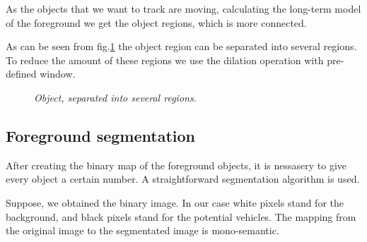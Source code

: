\documentclass[12pt,a4paper,oneside,titlepage]{article}
\begin{document}
As the objects that we want to track are moving, calculating the long-term model of  the foreground we get the object regions, which is more connected.

As can be seen from fig.\ref{fig:fig3} the object region can be separated into several regions.
To reduce the amount of these regions we use the dilation operation with pre-defined window.




\begin{figure}[h]
  \caption{\textit{Object, separated into several regions.}}
  \label{fig:fig3}
\end{figure}

































\subsection{Foreground segmentation}


After creating the binary map of the foreground objects, it is nessasery to give every object a certain number.
A straightforward segmentation algorithm is used.


Suppose, we obtained the binary image.
In our case white pixels stand for the background, and black pixels stand for the potential vehicles.
The mapping from the original image to the segmentated image is mono-semantic. 

\end{document}

